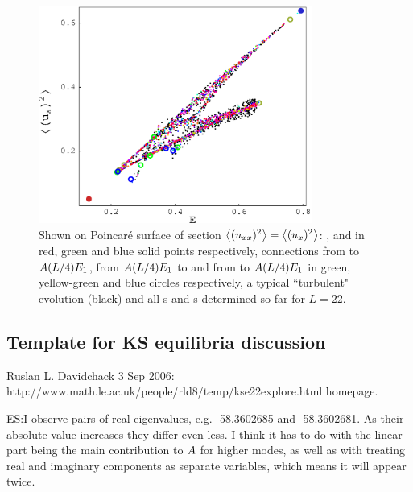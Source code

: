 \begin{figure}[t] \label{f:drivedragPoinc}
\begin{center}
    \includegraphics[width=0.8\textwidth]{figs/energyPoinc.eps}
\end{center}
\caption{
Shown on Poincar\'{e} surface of section 
$\left\langle {(u_{xx})^2} \right\rangle = \left\langle {(u_{x})^2} \right\rangle$:
,  and  in red, green and blue solid points respectively,
connections from  to $A(L/4)E_{1}$,
from $A(L/4)E_{1}$ to  and from  to $A(L/4)E_{1}$ in green, 
yellow-green and blue circles respectively,
a typical ``turbulent" evolution (black) and all \po s and \rpo s 
determined so far for $L=22$.
        }
\end{figure}



\subsection{Template for KS equilibria discussion}

Ruslan L. Davidchack 3 Sep 2006:
http://www.math.le.ac.uk/people/rld8/temp/kse22explore.html homepage.


ES:{I observe pairs of real eigenvalues,
e.g. -58.3602685 and -58.3602681. As their absolute
value increases they differ even less.
I think it has to do with the linear part being the main
contribution to $A$ for higher modes, as well as
with treating real and imaginary components
as separate variables, which means it will appear twice.
        }

